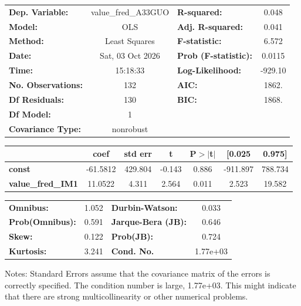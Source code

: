 \begin{center}
\begin{tabular}{lclc}
\toprule
\textbf{Dep. Variable:}    & value\_fred\_A33GUO & \textbf{  R-squared:         } &     0.048   \\
\textbf{Model:}            &         OLS         & \textbf{  Adj. R-squared:    } &     0.041   \\
\textbf{Method:}           &    Least Squares    & \textbf{  F-statistic:       } &     6.572   \\
\textbf{Date:}             &   Sat, 03 Oct 2026  & \textbf{  Prob (F-statistic):} &   0.0115    \\
\textbf{Time:}             &       15:18:33      & \textbf{  Log-Likelihood:    } &   -929.10   \\
\textbf{No. Observations:} &           132       & \textbf{  AIC:               } &     1862.   \\
\textbf{Df Residuals:}     &           130       & \textbf{  BIC:               } &     1868.   \\
\textbf{Df Model:}         &             1       & \textbf{                     } &             \\
\textbf{Covariance Type:}  &      nonrobust      & \textbf{                     } &             \\
\bottomrule
\end{tabular}
\begin{tabular}{lcccccc}
                          & \textbf{coef} & \textbf{std err} & \textbf{t} & \textbf{P$> |$t$|$} & \textbf{[0.025} & \textbf{0.975]}  \\
\midrule
\textbf{const}            &     -61.5812  &      429.804     &    -0.143  &         0.886        &     -911.897    &      788.734     \\
\textbf{value\_fred\_IM1} &      11.0522  &        4.311     &     2.564  &         0.011        &        2.523    &       19.582     \\
\bottomrule
\end{tabular}
\begin{tabular}{lclc}
\textbf{Omnibus:}       &  1.052 & \textbf{  Durbin-Watson:     } &    0.033  \\
\textbf{Prob(Omnibus):} &  0.591 & \textbf{  Jarque-Bera (JB):  } &    0.646  \\
\textbf{Skew:}          &  0.122 & \textbf{  Prob(JB):          } &    0.724  \\
\textbf{Kurtosis:}      &  3.241 & \textbf{  Cond. No.          } & 1.77e+03  \\
\bottomrule
\end{tabular}
\end{center}

Notes: \newline
 [1] Standard Errors assume that the covariance matrix of the errors is correctly specified. \newline
 [2] The condition number is large, 1.77e+03. This might indicate that there are \newline
 strong multicollinearity or other numerical problems.